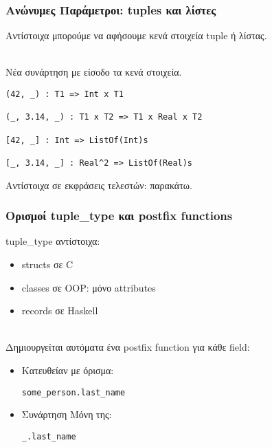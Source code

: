 \documentclass{beamer}
\def\e{\foreignlanguage{english}}
\def\h{\e{Haskell}}
\begin{document}
\begin{frame}[fragile]

\frametitle{Ανώνυμες Παράμετροι: \e{tuples} και λίστες}

Αντίστοιχα μπορούμε να αφήσουμε κενά στοιχεία \e{tuple} ή λίστας.
\\~\

Νέα συνάρτηση με είσοδο τα κενά στοιχεία.
\pause

\begin{otherlanguage}{english}
\begin{verbatim}
(42, _) : T1 => Int x T1

(_, 3.14, _) : T1 x T2 => T1 x Real x T2

[42, _] : Int => ListOf(Int)s

[_, 3.14, _] : Real^2 => ListOf(Real)s

\end{verbatim}
\end{otherlanguage}

\pause
Αντίστοιχα σε εκφράσεις τελεστών: παρακάτω.

\end{frame}

\begin{frame}[fragile]

\frametitle{Ορισμοί \e{tuple\_type} και \e{postfix functions}}

\e{tuple\_type} αντίστοιχα:

\begin{itemize}

\item \e{structs} σε \e{C}

\item \e{classes} σε \e{OOP}: μόνο \e{attributes}

\item \e{records} σε \h
\\~\

\end{itemize}

\pause
Δημιουργείται αυτόματα ένα \e{postfix function} για κάθε \e{field}:

\begin{itemize}

\item Κατευθείαν με όρισμα:
\begin{otherlanguage}{english}
\verb|some_person.last_name|
\end{otherlanguage}

\item Συνάρτηση Μόνη της:
\begin{otherlanguage}{english}
\verb|_.last_name|
\end{otherlanguage}

\end{itemize}

\end{frame}
\end{document}
